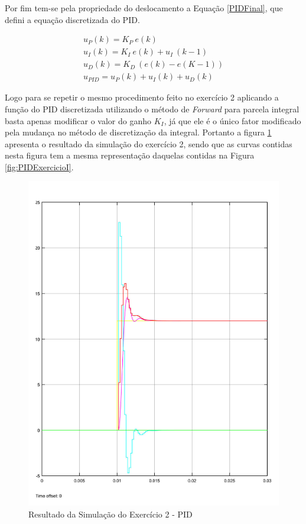 	Por fim tem-se pela propriedade do deslocamento a Equação \ref{PIDFinal}, que defini a equação discretizada do PID.
	
	\begin{eqnarray}
		u_P (k) = K_P~e(k) \\
		u_I (k) = K_I~e(k) + u_I~(k-1) \\
		u_D (k) = K_D~(e(k) - e(K - 1)) \\
		u_{PID} = u_P(k) + u_I (k) + u_D(k)
		\label{PIDFinal}	
	\end{eqnarray}
	
	Logo para se repetir o mesmo procedimento feito no exercício 2 aplicando a função do PID discretizada utilizando o método de \emph{Forward}  para parcela integral basta apenas
	modificar o valor do ganho $K_I$, já que ele é o único fator modificado pela mudança no método de discretização da integral. Portanto a figura \ref{fig:PIDExercicioII} apresenta o resultado da simulação do exercício 2, sendo que as curvas contidas nesta figura tem a mesma representação daquelas contidas  na Figura \ref{fig:PIDExercicioI}. 
	
	\begin{figure}[H]
		\centering
		\includegraphics[scale = .4]{Imagens/PIDExercicioII.pdf}
		\caption{Resultado da Simulação do Exercício 2 - PID}
		\label{fig:PIDExercicioII}
	\end{figure}
	
